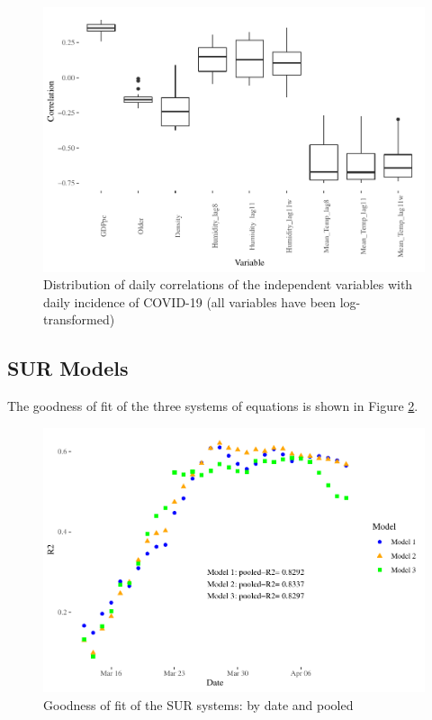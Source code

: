 \documentclass[]{elsarticle} %
\makeatletter
\def\maxwidth{\ifdim\Gin@nat@width>\linewidth\linewidth
\else\Gin@nat@width\fi}
\let\Oldincludegraphics\includegraphics
\renewcommand{\includegraphics}[1]{\Oldincludegraphics[width=\maxwidth]{#1}}
\makeatother
\begin{document}
\begin{figure}
\centering
\includegraphics{Environmental-Correlates-of-COVID19-Spain_files/figure-latex/daily-correlations-1.pdf}
\caption{\label{fig:daily-correlations}Distribution of daily
correlations of the independent variables with daily incidence of
COVID-19 (all variables have been log-transformed)}
\end{figure}

\hypertarget{sur-models}{%
\subsection{SUR Models}\label{sur-models}}

The goodness of fit of the three systems of equations is shown in Figure
\ref{fig:goodness-of-fit}.

\begin{figure}
\centering
\includegraphics{Environmental-Correlates-of-COVID19-Spain_files/figure-latex/goodness-of-fit-1.pdf}
\caption{\label{fig:goodness-of-fit} Goodness of fit of the SUR systems:
by date and pooled}
\end{figure}
\end{document}
